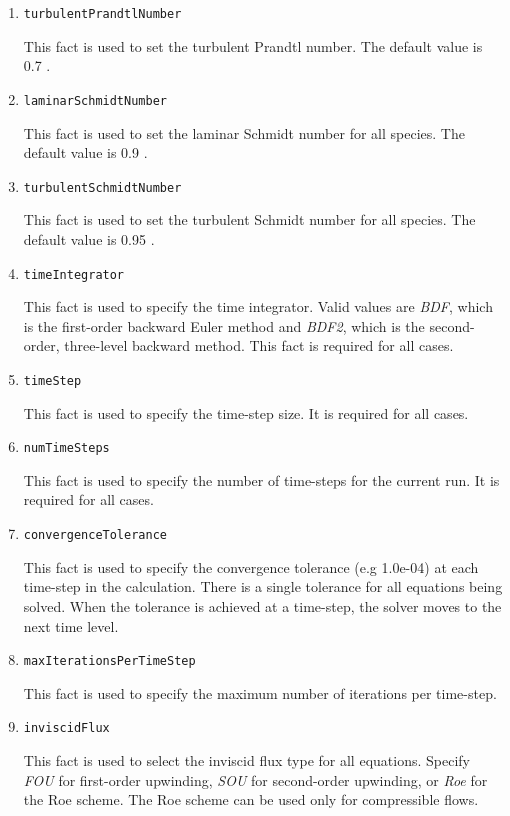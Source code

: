\documentclass{article}
\begin{document}
\begin{enumerate}
\item{\tt turbulentPrandtlNumber}

This fact is used to set the turbulent Prandtl number. The default value
is 0.7 .

\item{\tt laminarSchmidtNumber}

This fact is used to set the laminar Schmidt number for all species.
The default value is 0.9 .

\item{\tt turbulentSchmidtNumber}

This fact is used to set the turbulent Schmidt number for all species.
The default value is 0.95 .

\item{\tt timeIntegrator}

This fact is used to specify the time integrator. Valid values are \emph{BDF},
which is the first-order backward Euler method and \emph{BDF2}, which is the
second-order, three-level backward method. This fact is required for all cases.

\item{\tt timeStep}

This fact is used to specify the time-step size. It is required for all cases.

\item{\tt numTimeSteps}

This fact is used to specify the number of time-steps for the current run.
It is required for all cases.

\item{\tt convergenceTolerance}

This fact is used to specify the convergence tolerance (e.g 1.0e-04) at each
time-step in the calculation. There is a single tolerance for all equations
being solved. When the tolerance is achieved at a time-step, the solver moves
to the next time level.

\item{\tt maxIterationsPerTimeStep}

This fact is used to specify the maximum number of iterations per time-step.

\item{\tt inviscidFlux}

This fact is used to select the inviscid flux type for all equations. Specify
\emph{FOU} for first-order upwinding, \emph{SOU} for second-order upwinding,
or \emph{Roe} for the Roe scheme. The Roe scheme can be used only for
compressible flows.


\end{enumerate}
\end{document}

